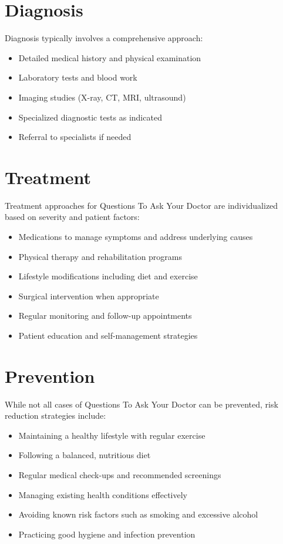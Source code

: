 \section*{Diagnosis}
Diagnosis typically involves a comprehensive approach:

\begin{itemize}
\item Detailed medical history and physical examination
\item Laboratory tests and blood work
\item Imaging studies (X-ray, CT, MRI, ultrasound)
\item Specialized diagnostic tests as indicated
\item Referral to specialists if needed
\end{itemize}

\section*{Treatment}
Treatment approaches for Questions To Ask Your Doctor are individualized based on severity and patient factors:

\begin{itemize}
\item Medications to manage symptoms and address underlying causes
\item Physical therapy and rehabilitation programs
\item Lifestyle modifications including diet and exercise
\item Surgical intervention when appropriate
\item Regular monitoring and follow-up appointments
\item Patient education and self-management strategies
\end{itemize}

\section*{Prevention}
While not all cases of Questions To Ask Your Doctor can be prevented, risk reduction strategies include:

\begin{itemize}
\item Maintaining a healthy lifestyle with regular exercise
\item Following a balanced, nutritious diet
\item Regular medical check-ups and recommended screenings
\item Managing existing health conditions effectively
\item Avoiding known risk factors such as smoking and excessive alcohol
\item Practicing good hygiene and infection prevention
\end{itemize}

